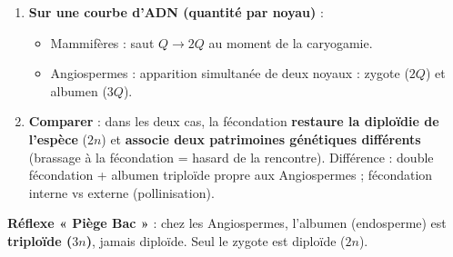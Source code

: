 \documentclass[11pt]{article}
\newcommand{\cle}[1]{{\popxbold\color{popdark}#1}}
\begin{document}
\begin{methode}
\begin{enumerate}
\begin{enumerate}
\item \textbf{Seconde fécondation} : 2ème noyau spermatique ($n$) + \textbf{cellule centrale} (2 noyaux polaires fusionnés = $2n$) $\to$ cellule \textbf{triploïde $3n$} (futur \textbf{albumen} / endosperme, tissu de réserve).
\end{enumerate}
C'est la \cle{double fécondation}, synapomorphie des Angiospermes.
\item \textbf{Sur une courbe d'ADN (quantité par noyau)} :
\begin{itemize}
\item Mammifères : saut $Q \to 2Q$ au moment de la caryogamie.
\item Angiospermes : apparition simultanée de deux noyaux : zygote ($2Q$) et albumen ($3Q$).
\end{itemize}
\item \textbf{Comparer} : dans les deux cas, la fécondation \textbf{restaure la diploïdie de l'espèce} ($2n$) et \textbf{associe deux patrimoines génétiques différents} (brassage à la fécondation = hasard de la rencontre). Différence : double fécondation + albumen triploïde propre aux Angiospermes ; fécondation interne vs externe (pollinisation).
\end{enumerate}
\textbf{Réflexe « Piège Bac »} : chez les Angiospermes, l'albumen (endosperme) est \textbf{triploïde ($3n$)}, jamais diploïde. Seul le zygote est diploïde ($2n$).
\end{methode}
\end{document}
